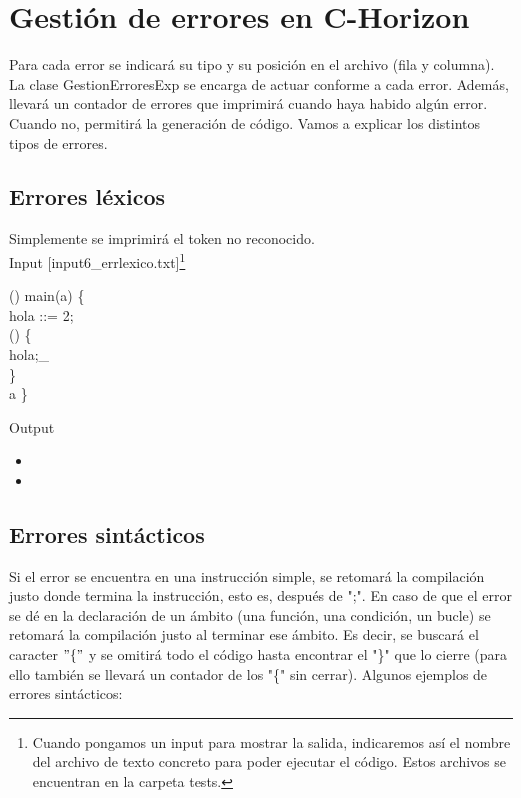 \chapter{Gestión de errores en C-Horizon}
\label{cap:errores}

Para cada error se indicará su tipo y su posición en el archivo (fila y columna). La clase GestionErroresExp se
encarga de actuar conforme a cada error. Además, llevará un contador de errores que imprimirá cuando haya habido
algún error. Cuando no, permitirá la generación de código. Vamos a explicar los distintos tipos de errores. 

\section{Errores léxicos}
Simplemente se imprimirá el token no reconocido.\\

Input [input6\_errlexico.txt]\footnote[1]{Cuando pongamos un input para mostrar la salida, indicaremos así el nombre del archivo
de texto concreto para poder ejecutar el código. Estos archivos se encuentran en la carpeta tests.}
\begin{algorithm}	
	\Integer{}(\Integer{}) main(a) \{ \\
	\quad \Integer{} hola ::= 2;  \\
	\quad \Whilee{} () \{ \\
	\quad\quad hola\operator{++};\_ \\
	\quad\} \\
	\quad	\Returnn a\;
	\}\;
\end{algorithm}

Output

\begin{itemize}
	\item {}
	\item {}
\end{itemize}
\newpage
\section{Errores sintácticos}
Si el error se encuentra en una instrucción simple, se retomará la 
compilación justo donde termina la instrucción, esto es, después de ";". En caso de que el error se dé en la declaración de un ámbito (una función, una 
condición, un bucle) se retomará la compilación justo al terminar ese ámbito. Es decir, se buscará el caracter $"\{"$ y se omitirá todo el código hasta 
encontrar el "\}" que lo cierre (para ello también se llevará un contador de los "\{" sin cerrar). Algunos ejemplos de errores sintácticos: 


